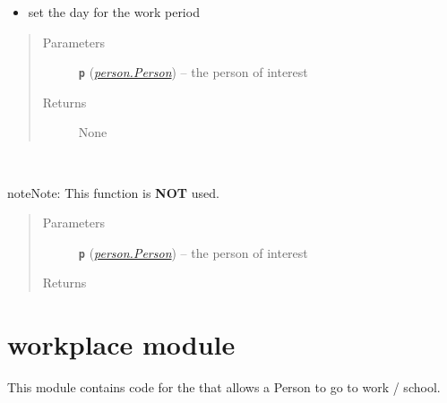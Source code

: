 \documentclass[letterpaper,10pt,english]{sphinxmanual}
\begin{document}
\begin{fulllineitems}
\begin{fulllineitems}
\begin{itemize}
\item {} 
set the day for the work period

\end{itemize}
\begin{quote}\begin{description}
\item[{Parameters}] \leavevmode
\textbf{\texttt{p}} ({\hyperref[person:person.Person]{\emph{\emph{person.Person}}}}) -- the person of interest

\item[{Returns}] \leavevmode
None

\end{description}\end{quote}

\end{fulllineitems}


\begin{fulllineitems}
\label{work:work.Work.test_func}~
\begin{notice}{note}{Note:}
This function is \textbf{NOT} used.
\end{notice}
\begin{quote}\begin{description}
\item[{Parameters}] \leavevmode
\textbf{\texttt{p}} ({\hyperref[person:person.Person]{\emph{\emph{person.Person}}}}) -- the person of interest

\item[{Returns}] \leavevmode


\end{description}\end{quote}

\end{fulllineitems}


\end{fulllineitems}



\section{workplace module}
\label{workplace::doc}\label{workplace:module-workplace}\label{workplace:workplace-module}
This module contains code for the {\hyperref[asset:asset.Asset]{\emph{}}} that allows a Person to go to work / school.
\end{document}
